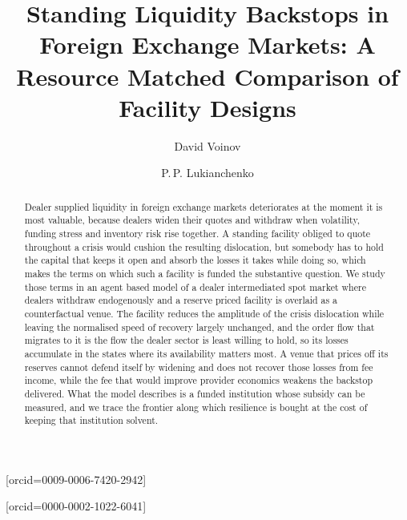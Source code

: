 \documentclass[a4paper,fleqn]{cas-sc}
\begin{document}
\let\WriteBookmarks\relax


\title[mode=title]{Standing Liquidity Backstops in Foreign Exchange Markets: A Resource Matched Comparison of Facility Designs}

\author[1]{David Voinov}[orcid=0009-0006-7420-2942]
\cormark[1]

\author[2]{P.\,P. Lukianchenko}[orcid=0000-0002-1022-6041]



\begin{abstract}
Dealer supplied liquidity in foreign exchange markets deteriorates at the moment it is most valuable, because dealers widen their quotes and withdraw when volatility, funding stress and inventory risk rise together. A standing facility obliged to quote throughout a crisis would cushion the resulting dislocation, but somebody has to hold the capital that keeps it open and absorb the losses it takes while doing so, which makes the terms on which such a facility is funded the substantive question. We study those terms in an agent based model of a dealer intermediated spot market where dealers withdraw endogenously and a reserve priced facility is overlaid as a counterfactual venue. The facility reduces the amplitude of the crisis dislocation while leaving the normalised speed of recovery largely unchanged, and the order flow that migrates to it is the flow the dealer sector is least willing to hold, so its losses accumulate in the states where its availability matters most. A venue that prices off its reserves cannot defend itself by widening and does not recover those losses from fee income, while the fee that would improve provider economics weakens the backstop delivered. What the model describes is a funded institution whose subsidy can be measured, and we trace the frontier along which resilience is bought at the cost of keeping that institution solvent.
\end{abstract}
\end{document}
